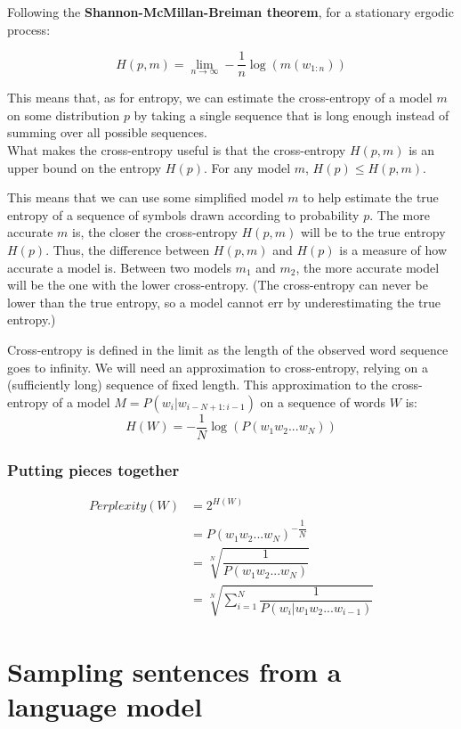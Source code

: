 Following the \textbf{Shannon-McMillan-Breiman theorem}, for a stationary ergodic process:

\[
    H(p,m) = \lim_{n \rightarrow \infty} - \dfrac{1}{n}\log(m(w_{1:n}))
\]

This means that, as for entropy, we can estimate the cross-entropy of a model $m$ on some distribution $p$ by taking a single sequence that is long enough instead of summing over all possible sequences.\\

What makes the cross-entropy useful is that the cross-entropy $H(p,m)$ is an upper bound on the entropy $H(p)$. For any model $m$, \(H(p) \leq H(p,m)\).


This means that we can use some simplified model $m$ to help estimate the true entropy of a sequence of symbols drawn according to probability $p$. The more accurate $m$ is, the closer the cross-entropy $H(p,m)$ will be to the true entropy $H(p)$. Thus, the difference between $H(p,m)$ and $H(p)$ is a measure of how accurate a model is. Between two models $m_1$ and $m_2$, the more accurate model will be the one with the lower cross-entropy. (The cross-entropy can never be lower than the true entropy, so a model cannot err by underestimating the true entropy.)

Cross-entropy is defined in the limit as the length of the observed word sequence goes to infinity. We will need an approximation to cross-entropy, relying on a (sufficiently long) sequence of fixed length. This approximation to the cross-entropy of a model $M = P(w_i|w_{i-N+1:i-1})$ on a sequence of words $W$ is:
\[
    H(W) = -\dfrac{1}{N}\log(P(w_1w_2...w_N))
\]


\subsubsection{Putting pieces together}
\begin{align*}
    Perplexity(W)       
        &= 2^{H(W)}    \\ 
        &= P(w_1w_2...w_N)^{-\dfrac{1}{N}} \\ 
        &= \sqrt[N]{\dfrac{1}{P(w_1w_2...w_N)}} \\ 
        &= \sqrt[N]{\sum_{i=1}^{N} \dfrac{1}{P(w_i|w_1w_2...w_{i-1})}} 
\end{align*}





\section{Sampling sentences from a language model \cite{nlp-1}}

